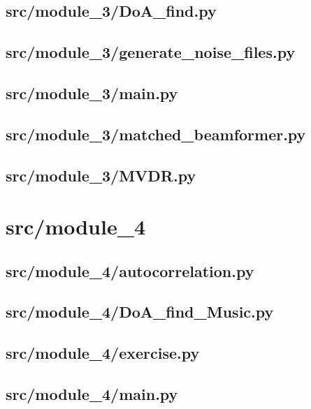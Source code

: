 \subsection*{src/module\_3/DoA\_find.py}
\label{ap:DoA_find}
\subsection*{src/module\_3/generate\_noise\_files.py}
\label{ap:generate_noise_files}
\subsection*{src/module\_3/main.py}
\label{ap:module_3-main}
\subsection*{src/module\_3/matched\_beamformer.py}
\label{ap:matched_beamformer}
\subsection*{src/module\_3/MVDR.py}
\label{ap:MVDR}
\section{src/module\_4}
\subsection*{src/module\_4/autocorrelation.py}
\label{ap:autocorrelation}
\subsection*{src/module\_4/DoA\_find\_Music.py}
\label{ap:DoA_find_Music}
\subsection*{src/module\_4/exercise.py}
\label{ap:exercise}
\subsection*{src/module\_4/main.py}
\label{ap:module_4-main}
